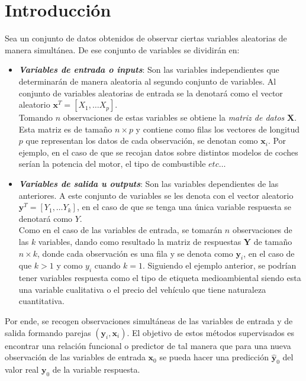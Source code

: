 \section{Introducción}
\noindent Sea un conjunto de datos obtenidos de observar ciertas variables aleatorias de manera simultánea. De ese conjunto de variables se dividirán en:
\begin{itemize}
\item \textbf{\textit{Variables de entrada o inputs}}: Son las variables independientes que determinarán de manera aleatoria al segundo conjunto de variables. Al conjunto de variables aleatorias de entrada se la denotará como el vector aleatorio $\textbf{x}^T=[X_1,\ldots X_p]$. \\
Tomando $n$ observaciones de estas variables se obtiene la \textit{matriz de datos} $\textbf{X}$. Esta matriz es de tamaño $n\times p$ y contiene como filas los vectores de longitud $p$ que representan los datos de cada observación, se denotan como $\textbf{x}_i$. Por ejemplo, en el caso de que se recojan datos sobre distintos modelos de coches serían la potencia del motor, el tipo de combustible $etc\ldots$
\item \textbf{\textit{Variables de salida u outputs}}: Son las variables dependientes de las anteriores. A este conjunto de variables se les denota con el vector aleatorio $\textbf{y}^T=[Y_1,\ldots Y_k]$, en el caso de que se tenga una única variable respuesta se denotará como $Y$. \\
Como en el caso de las variables de entrada, se tomarán $n$ observaciones de las $k$ variables, dando como resultado la matriz de respuestas $\textbf{Y}$ de tamaño $n \times k$, donde cada observación es una fila y se denota como $\textbf{y}_i$, en el caso de que $k>1$ y como $y_i$ cuando $k=1$. Siguiendo el ejemplo anterior, se podrían tener variables respuesta como el tipo de etiqueta medioambiental siendo esta una variable cualitativa o el precio del vehículo que tiene naturaleza cuantitativa. 
\end{itemize}
\noindent Por ende, se recogen observaciones simultáneas de las variables de entrada y de salida formando parejas $(\textbf{y}_i,\textbf{x}_i)$. El objetivo de estos métodos supervisados es encontrar una relación funcional o predictor de tal manera que para una nueva observación de las variables de entrada $\textbf{x}_0$ se pueda hacer una predicción $\hat{\textbf{y}}_0$ del valor real $\textbf{y}_0$ de la variable respuesta. 
 
